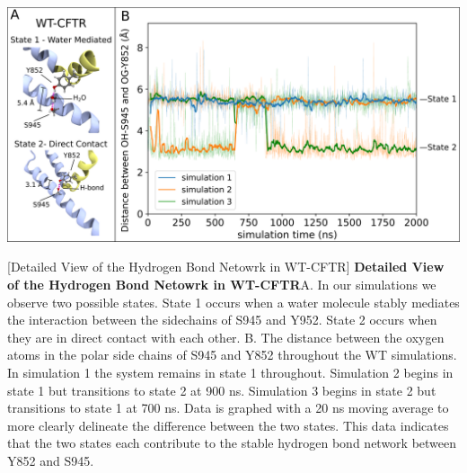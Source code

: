 \begin{center}
	\includegraphics[width=\textwidth]{figures/S945L/supp1_MD.pdf}
\end{center}
	\captionsetup{singlelinecheck = false, justification=raggedright}
\begingroup
{}[Detailed View of the Hydrogen Bond Netowrk in WT-CFTR] {\textbf{Detailed View of the Hydrogen Bond Netowrk in WT-CFTR}}{A. In our simulations we observe two possible states. State 1 occurs when a water molecule stably mediates the interaction between the sidechains of S945 and Y952. State 2 occurs when they are in direct contact with each other. B. The distance between the oxygen atoms in the polar side chains of S945 and Y852 throughout the WT simulations. In simulation 1 the system remains in state 1 throughout. Simulation 2 begins in state 1 but transitions to state 2 at 900 ns. Simulation 3 begins in state 2 but transitions to state 1 at 700 ns. Data is graphed with a 20 ns moving average to more clearly delineate the difference between the two states. This data indicates that the two states each contribute to the stable hydrogen bond network between Y852 and S945.}
\label{S945L_MD_S1}
\endgroup

